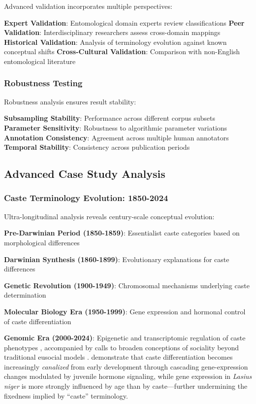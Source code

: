 \documentclass[
]{article}
\numberwithin{equation}{section}
\begin{document}
Advanced validation incorporates multiple perspectives:

\textbf{Expert Validation}: Entomological domain experts review
classifications \textbf{Peer Validation}: Interdisciplinary researchers
assess cross-domain mappings \textbf{Historical Validation}: Analysis of
terminology evolution against known conceptual shifts
\textbf{Cross-Cultural Validation}: Comparison with non-English
entomological literature

\subsubsection{Robustness Testing}\label{robustness-testing}

Robustness analysis ensures result stability:

\textbf{Subsampling Stability}: Performance across different corpus
subsets \textbf{Parameter Sensitivity}: Robustness to algorithmic
parameter variations \textbf{Annotation Consistency}: Agreement across
multiple human annotators \textbf{Temporal Stability}: Consistency
across publication periods

\subsection{Advanced Case Study
Analysis}\label{advanced-case-study-analysis}

\subsubsection{Caste Terminology Evolution:
1850-2024}\label{caste-terminology-evolution-1850-2024}

Ultra-longitudinal analysis reveals century-scale conceptual evolution:

\textbf{Pre-Darwinian Period (1850-1859)}: Essentialist caste categories
based on morphological differences

\textbf{Darwinian Synthesis (1860-1899)}: Evolutionary explanations for
caste differences

\textbf{Genetic Revolution (1900-1949)}: Chromosomal mechanisms
underlying caste determination

\textbf{Molecular Biology Era (1950-1999)}: Gene expression and hormonal
control of caste differentiation

\textbf{Genomic Era (2000-2024)}: Epigenetic and transcriptomic
regulation of caste phenotypes \cite{chandra2021epigenetics},
accompanied by calls to broaden conceptions of sociality beyond
traditional eusocial models \cite{sociable2025}. \citet{warner2024caste}
demonstrate that caste differentiation becomes increasingly
\emph{canalized} from early development through cascading
gene-expression changes modulated by juvenile hormone signaling, while
gene expression in \emph{Lasius niger} is more strongly influenced by
age than by caste---further undermining the fixedness implied by
``caste'' terminology.
\end{document}
